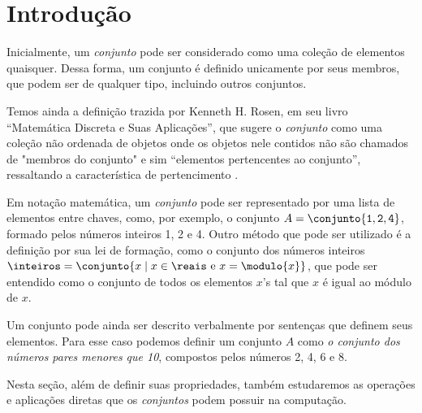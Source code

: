 \section{Introdução}

Inicialmente, um \emph{conjunto} pode ser considerado como uma coleção de elementos quaisquer. Dessa forma, um conjunto é definido unicamente por seus membros, que podem ser de qualquer tipo, incluindo outros conjuntos. 

Temos ainda a definição trazida por Kenneth H. Rosen, em seu livro “Matemática Discreta e Suas Aplicações”, que sugere o \emph{conjunto} como uma coleção não ordenada de objetos onde os objetos nele contidos não são chamados de "membros do conjunto" e sim “elementos pertencentes ao conjunto”, ressaltando a característica de pertencimento \cite[pp. 111--112]{kenneth2010}.

Em notação matemática, um \emph{conjunto} pode ser representado por uma lista de elementos entre chaves, como, por exemplo, o conjunto $A = \conjunto {\texttt 1, \texttt 2, \texttt 4}$, formado pelos números inteiros 1, 2 e 4. Outro método que pode ser utilizado é a definição por sua lei de formação, como o conjunto dos números inteiros $\inteiros = \conjunto {x \mid x \in \reais \text{ e } x = \modulo{x} }$, que pode ser entendido como o conjunto de todos os elementos $x$'s tal que $x$ é igual ao módulo de $x$.

Um conjunto pode ainda ser descrito verbalmente por sentenças que definem seus elementos. Para esse caso podemos definir um conjunto $A$ como \emph{o conjunto dos números pares menores que 10}, compostos pelos números 2, 4, 6 e 8. 

Nesta seção, além de definir suas propriedades, também estudaremos as operações e aplicações diretas que os \emph{conjuntos} podem possuir na computação.